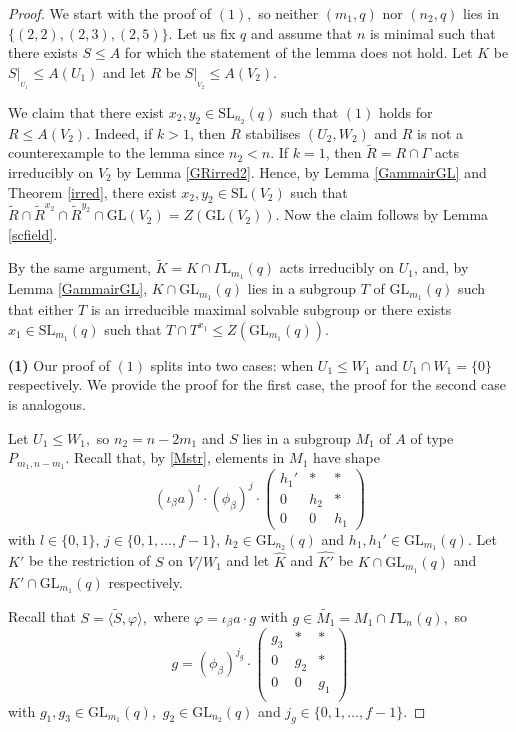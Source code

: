 \documentclass[a4paper,reqno,11pt]{amsart}
\theoremstyle{definition}
\theoremstyle{remark}
\numberwithin{equation}{section}
\newcommand{\GaL}{{\Gamma \mathrm{L}}}
\newcommand{\SL}{{\mathrm{SL}}}
\newcommand{\GL}{{\mathrm{GL}}}
\begin{document}
\begin{proof}
We start with the proof of $(1),$ so neither $(m_1,q)$ nor $(n_2,q)$ lies in $\{(2,2), (2,3),(2,5)\}.$ 
Let us fix $q$ and assume that $n$ is minimal such that there exists $S\le A$ for which the statement of the lemma does not hold. Let $K$ be $S|_{_{U_1}} \le A(U_1)$ and let $R$ be $S|_{_{V_2}} \le A(V_2).$

We claim that there exist $x_2, y_2 \in \SL_{n_2}(q)$ such that $(1)$ holds for $R \le A(V_2)$. Indeed, if $k>1$, then $R$ stabilises $(U_2,W_2)$ and $R$ is not a counterexample to the lemma since $n_2<n.$ If $k=1$, then $\tilde{R}=R \cap \Gamma$ acts irreducibly on $V_2$ by Lemma \ref{GRirred2}.  Hence, by  Lemma \ref{GammairGL} and Theorem \ref{irred},   there exist $x_2,y_2 \in \SL(V_2)$ such that $\tilde{R} \cap \tilde{R}^{x_2} \cap \tilde{R}^{y_2} \cap \GL(V_2)= Z(\GL(V_2)).$ Now the claim follows by Lemma \ref{scfield}.

By the same argument, $\tilde{K}=K \cap \GaL_{m_1}(q)$ acts irreducibly on $U_1$, and, by Lemma \ref{GammairGL},   $K \cap \GL_{m_1}(q)$ lies in a subgroup $T$ of $\GL_{m_1}(q)$ such that  either $T$ is an  irreducible maximal solvable subgroup  or there exists $x_1 \in \SL_{m_1}(q)$ such that $T \cap T^{x_1} \le Z(\GL_{m_1}(q))$.

\medskip

 {\bf(1)} Our proof of $(1)$ splits into two cases: when $U_1 \le W_1$ and  $U_1\cap W_1=\{0\}$ respectively. We provide the proof for the first case, the proof for the second case is analogous. 
\medskip

 Let $U_1 \le W_1,$ so $n_2=n-2m_1$ and $S$ lies in a  subgroup $M_1$ of $A$ of type $P_{m_1, n-m_1}.$ Recall that, by \eqref{Mstr}, elements in $M_1$ have shape 
\begin{equation}
\label{GRPmnmdiag}
(\iota_{\beta} a)^l \cdot (\phi_{\beta})^j \cdot 
\begin{pmatrix}
h_1' & * & *\\
 0   & h_2 & *\\
 0   & 0 & h_1
\end{pmatrix}
\end{equation}
with $l \in \{0,1\}$, $j \in \{0, 1, \ldots, f-1\}$, $h_2 \in \GL_{n_2}(q)$ and $h_1, h_1' \in \GL_{m_1}(q).$ Let $K'$ be the restriction of $S$ on $V/W_1$ and let $\hat{K}$ and $\hat{K'}$ be $K \cap \GL_{m_1}(q)$ and $K' \cap \GL_{m_1}(q)$ respectively.

 Recall that $S=\langle \tilde{S}, \varphi \rangle,$ where $\varphi = \iota_{\beta} a \cdot g$ with $g \in \tilde{M_1}=M_1 \cap \GaL_n(q),$ so 
$$g= (\phi_{\beta})^{j_g} \cdot 
\begin{pmatrix}
g_3 & * & * \\
0  & g_2 & *\\
0 & 0 & g_1 \\
\end{pmatrix}
$$ with $g_1, g_3 \in \GL_{m_1}(q),$ $g_2 \in \GL_{n_2}(q)$ and $j_g \in \{0,1, \ldots, f-1\}.$ 


\end{proof}
\end{document}
